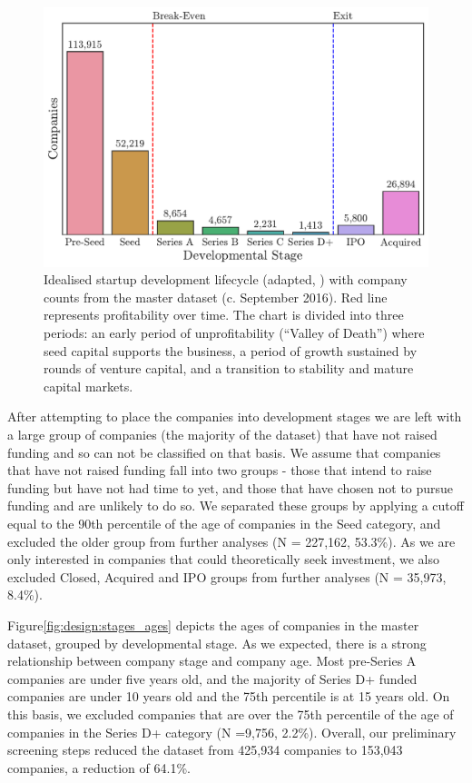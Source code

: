 \documentclass[../thesis/thesis.tex]{subfiles}
\begin{document}
\begin{figure}[!htb]
    \centering
    \includegraphics[width=\textwidth]{../figures/design/lifecycle}
    \caption{Idealised startup development lifecycle (adapted, \cite{}) with company counts from the master dataset (c. September 2016). Red line represents profitability over time. The chart is divided into three periods: an early period of unprofitability (``Valley of Death'') where seed capital supports the business, a period of growth sustained by rounds of venture capital, and a transition to stability and mature capital markets.}
    \label{fig:design:lifecycle}
\end{figure}

After attempting to place the companies into development stages we are left with a large group of companies (the majority of the dataset) that have not raised funding and so can not be classified on that basis. We assume that companies that have not raised funding fall into two groups - those that intend to raise funding but have not had time to yet, and those that have chosen not to pursue funding and are unlikely to do so. We separated these groups by applying a cutoff equal to the 90th percentile of the age of companies in the Seed category, and excluded the older group from further analyses (N = 227,162,  53.3\%). As we are only interested in companies that could theoretically seek investment, we also excluded Closed, Acquired and IPO groups from further analyses (N = 35,973, 8.4\%).

Figure\ref{fig:design:stages_ages} depicts the ages of companies in the master dataset, grouped by developmental stage.  As we expected, there is a strong relationship between company stage and company age. Most pre-Series A companies are under five years old, and the majority of Series D+ funded companies are under 10 years old and the 75th percentile is at 15 years old. On this basis, we excluded companies that are over the 75th percentile of the age of companies in the Series D+ category (N =9,756, 2.2\%). Overall, our preliminary screening steps reduced the dataset from 425,934 companies to 153,043 companies, a reduction of 64.1\%.
\end{document}
